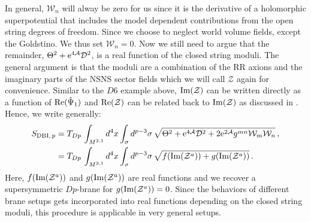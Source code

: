 \documentclass[12pt]{report}
\newcommand{\bea}{\begin{equation}\begin{aligned}}
\newcommand{\eea}{\end{aligned}\end{equation}}
\def\rme{{\rm e}}
\def\rmre{{\rm Re}}
\def\rmim{{\rm Im}}
\begin{document}
In general, $\mathcal{W}_n$ will alway be zero for us since it is the derivative of a holomorphic superpotential that includes the model dependent contributions from the open string degrees of freedom. Since we choose to neglect world volume fields, except the Goldstino. We thus set $\mathcal{W}_n = 0$. Now we still need to argue that the remainder, $\Theta^2 + \rme^{4\mathcal{A}} \mathcal{D}^2$, is a real function of the closed string moduli. The general argument is that the moduli are a combination of the RR axions and the imaginary parts of the NSNS sector fields which we will call $\mathcal{Z}$ again for convenience. Similar to the $D6$ example above, $\rmim(\mathcal{Z})$ can be written directly as a function of $\rmre(\hat{\Psi}_1)$ and $\rmre(\mathcal{Z})$ can be related back to $\rmim(\mathcal{Z})$ as discussed in \cite{Grana:2005jc}. Hence, we write generally:
\bea 
S_{\text{DBI},\,p} &= T_{Dp} \, \int_{M^{3,1}} d^4x \int_\sigma d^{p-3}\sigma \, \sqrt{\Theta^2 + \rme^{4\mathcal{A}} \mathcal{D}^2 + 2 \rme^{2\mathcal{A}} g^{mn} \mathcal{W}_m \mathcal{W}_n}\,,\\
&= T_{Dp} \, \int_{M^{3,1}} d^4x \int_\sigma d^{p-3}\sigma \, \sqrt{ f(\rmim(\mathcal{Z}^a))+g(\rmim(\mathcal{Z}^a))}\,.
\eea
Here, $f(\rmim(\mathcal{Z}^a))$ and $g(\rmim(\mathcal{Z}^a))$ are real functions and we recover a supersymmetric $Dp$-brane for $g(\rmim(\mathcal{Z}^a)) = 0$. Since the behaviors of different brane setups gets incorporated into real functions depending on the closed string moduli, this procedure is applicable in very general setups.
\end{document}
